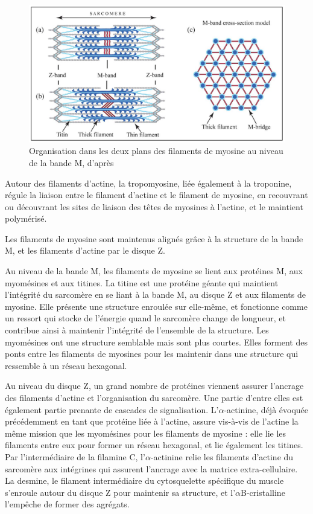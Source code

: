 \begin{figure}[p]
\includegraphics[scale=0.4]{Figures/Myomesine.png}
\caption{Organisation dans les deux plans des filaments de myosine au niveau de la bande M, d'après \cite{tskhovrebova_making_2012}}
\end{figure}
 
Autour des filaments d'actine, la tropomyosine, liée également à la troponine, régule la liaison entre le filament d'actine et le filament de myosine, en recouvrant ou découvrant les sites de liaison des têtes de myosines à l'actine, et le maintient polymérisé. 

Les filaments de myosine sont maintenus alignés grâce à la structure de la bande M, et les filaments d'actine par le disque Z. 

Au niveau de la bande M, les filaments de myosine se lient aux protéines M, aux myomésines et aux titines. 
La titine est une protéine géante qui maintient l'intégrité du sarcomère en se liant à la bande M, au disque Z et aux filaments de myosine. Elle présente une structure enroulée sur elle-même, et fonctionne comme un ressort qui stocke de l'énergie quand le sarcomère change de longueur, et contribue ainsi à maintenir l'intégrité de l'ensemble de la structure. 
Les myomésines ont une structure semblable mais sont plus courtes. Elles forment des ponts entre les filaments de myosines pour les maintenir dans une structure qui ressemble à un réseau hexagonal. 

Au niveau du disque Z, un grand nombre de protéines viennent assurer l'ancrage des filaments d'actine et l'organisation du sarcomère. Une partie d'entre elles est également partie prenante de cascades de signalisation.
L'$\alpha$-actinine, déjà évoquée précédemment en tant que protéine liée à l'actine, assure vis-à-vis de l'actine la même mission que les myomésines pour les filaments de myosine : elle lie les filaments entre eux pour former un réseau hexagonal, et lie également les titines. 
Par l'intermédiaire de la filamine C, l'$\alpha$-actinine relie les filaments d'actine du sarcomère aux intégrines qui assurent l'ancrage avec la matrice extra-cellulaire. 
La desmine, le filament intermédiaire du cytosquelette spécifique du muscle s'enroule autour du disque Z pour maintenir sa structure, et l'$\alpha$B-cristalline l'empêche de former des agrégats. 


